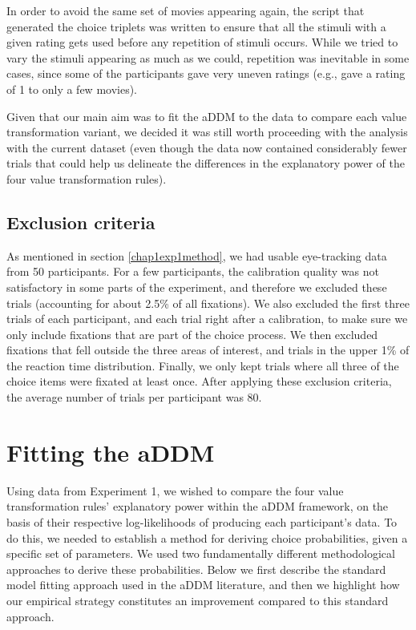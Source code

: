 \documentclass[11pt,a4paper]{article}
\begin{document}
In order to avoid the same set of movies appearing again, the script that generated the choice triplets was written to ensure that all the stimuli with a given rating gets used before any repetition of stimuli occurs. While we tried to vary the stimuli appearing as much as we could, repetition was inevitable in some cases, since some of the participants gave very uneven ratings (e.g., gave a rating of 1 to only a few movies). 

Given that our main aim was to fit the aDDM to the data to compare each value transformation variant, we decided it was still worth proceeding with the analysis with the current dataset (even though the data now contained considerably fewer trials that could help us delineate the differences in the explanatory power of the four value transformation rules). 

\subsection{Exclusion criteria}

As mentioned in section  \ref{chap1exp1method}, we had usable eye-tracking data from 50 participants. For a few participants, the calibration quality was not satisfactory in some parts of the experiment, and therefore we excluded these trials (accounting for about 2.5\% of all fixations). We also excluded the first three trials of each participant, and each trial right after a calibration, to make sure we only include fixations that are part of the choice process. We then excluded fixations that fell outside the three areas of interest, and trials in the upper 1\% of the reaction time distribution. Finally, we only kept trials where all three of the choice items were fixated at least once. After applying these exclusion criteria, the average number of trials per participant was 80.


\section{Fitting the aDDM}

Using data from Experiment 1, we wished to compare the four value transformation rules' explanatory power within the aDDM framework, on the basis of their respective log-likelihoods of producing each participant's data. To do this, we needed to establish a method for deriving choice probabilities, given a specific set of parameters. We used two fundamentally different methodological approaches to derive these probabilities. Below we first describe the standard model fitting approach used in the aDDM literature, and then we highlight how our empirical strategy constitutes an improvement compared to this standard approach.
\end{document}
